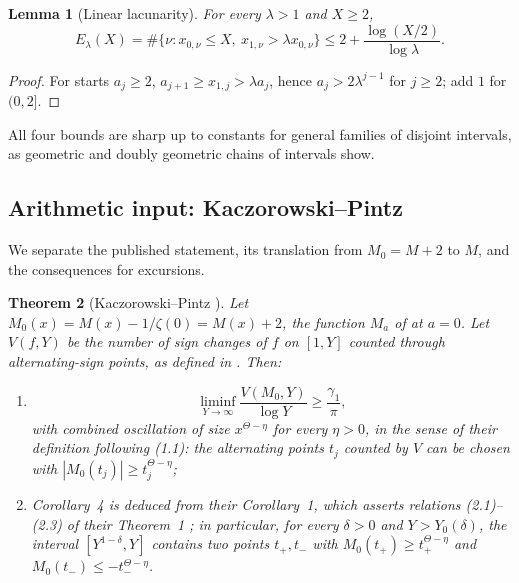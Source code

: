\documentclass[11pt]{amsart}
\numberwithin{equation}{section}
\theoremstyle{plain}
\newtheorem{theorem}{Theorem}[section]
\newtheorem{lemma}[theorem]{Lemma}
\theoremstyle{definition}
\theoremstyle{remark}
\begin{document}
\begin{lemma}[Linear lacunarity]
\label{lem:linear-lacunary}
For every $\lambda>1$ and $X\ge2$,
\begin{equation}
\label{eq:linear-lacunary-count}
E_\lambda(X)=\#\{\nu:x_{0,\nu}\le X,\ x_{1,\nu}>\lambda x_{0,\nu}\}
\le2+\frac{\log(X/2)}{\log\lambda}.
\end{equation}
\end{lemma}

\begin{proof}
For starts $a_j\ge2$, $a_{j+1}\ge x_{1,j}>\lambda a_j$, hence
$a_j>2\lambda^{j-1}$ for $j\ge2$; add $1$ for $(0,2]$.
\end{proof}

All four bounds are sharp up to constants for general families of disjoint
intervals, as geometric and doubly geometric chains of intervals show.

\subsection{Arithmetic input: Kaczorowski--Pintz}

We separate the published statement, its translation from $M_0=M+2$ to
$M$, and the consequences for excursions.

\begin{theorem}[Kaczorowski--Pintz {\cite{KP86}}]
\label{thm:KP-quoted}
Let $M_0(x)=M(x)-1/\zeta(0)=M(x)+2$, the function $M_a$ of \cite{KP86} at
$a=0$. Let $V(f,Y)$ be the number of sign changes of $f$ on $[1,Y]$
counted through alternating-sign points, as defined in \cite{KP86}. Then:
\begin{enumerate}[label=\textup{(\roman*)}]
\item \cite[Corollary~4, p.~178, (2.13)--(2.15)]{KP86}
\begin{equation}
\label{eq:KP-signchanges}
\liminf_{Y\to\infty}\frac{V(M_0,Y)}{\log Y}\ge\frac{\gamma_1}{\pi},
\end{equation}
with combined oscillation of size $x^{\Theta-\eta}$ for every $\eta>0$, in
the sense of their definition following (1.1): the alternating points $t_j$
counted by $V$ can be chosen with $|M_0(t_j)|\ge t_j^{\Theta-\eta}$;
\item Corollary~4 is deduced from their Corollary~1, which asserts relations
(2.1)--(2.3) of their Theorem~1 \cite[pp.~175--176]{KP86}; in particular,
for every $\delta>0$ and $Y>Y_0(\delta)$, the interval $[Y^{1-\delta},Y]$
contains two points $t_+,t_-$ with
$M_0(t_+)\ge t_+^{\Theta-\eta}$ and $M_0(t_-)\le-t_-^{\Theta-\eta}$.
\end{enumerate}
\end{theorem}
\end{document}
